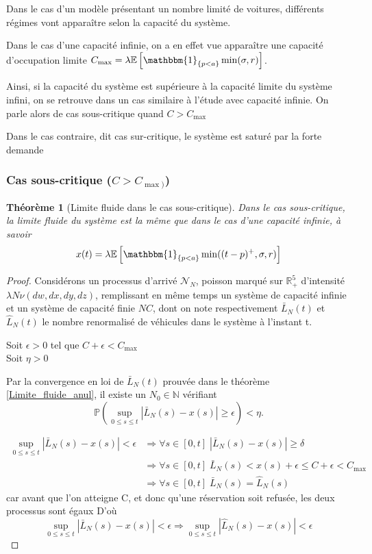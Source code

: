 \documentclass[12pt,a4paper]{article}
\newcommand{\E}[1]{\mathbb{E}\left[ #1 \right]}
\newcommand{\R}{\mathbb{R}}
\newcommand{\1}[1]{\mathbbm{1}_{\{#1\}} }
\newtheorem{theorem}{Théorème}
\theoremstyle{definition}
\begin{document}
{Dans le cas d'un modèle présentant un nombre limité de voitures, différents régimes vont apparaître selon la capacité du système.

Dans le cas d'une capacité infinie, on a en effet vue apparaître une capacité d'occupation limite $C_{\max} = \lambda \E{\1{p<a}\min(\sigma,r)}$.

Ainsi, si la capacité du système est supérieure à la capacité limite du système infini, on se retrouve dans un cas similaire à l'étude avec capacité infinie. On parle alors de cas sous-critique quand $C > C_{\max}$

Dans le cas contraire, dit cas sur-critique, le système est saturé par la forte demande



\subsubsection{Cas sous-critique ($C>C_{\max)}$)}

\begin{theorem}[Limite fluide dans le cas sous-critique]
Dans le cas sous-critique, la limite fluide du système est la même que dans le cas d'une capacité infinie, à savoir $$x(t) = \lambda\E{\1{p<a}\min((t-p)^+,\sigma,r)}$$ 

\end{theorem}
\begin{proof}
Considérons un processus d'arrivé $\mathcal{N}_N$, poisson marqué sur $\R_+^5$ d'intensité $\lambda N \nu(dw,dx,dy,dz)$, remplissant en même temps un système de capacité infinie et un système de capacité finie $NC$, dont on note respectivement $\bar{L}_N(t)$ et $\hat{L}_N(t)$ le nombre renormalisé de véhicules dans le système à l'instant t.

Soit $\epsilon>0$ tel que $C+\epsilon<C_{\max}$\\
Soit $\eta >0$

Par la convergence en loi de $\bar{L}_N(t)$ prouvée dans le théorème  \ref{Limite_fluide_anul}, il existe un $N_0\in \mathbb{N}$ vérifiant
$$\mathbb{P}\left(\underset{0\leq s \leq t}{\sup} |\bar{L}_N(s) - x(s)| \geq \epsilon \right) < \eta.$$

\begin{align}
\underset{0\leq s \leq t}{\sup} |\bar{L}_N(s) - x(s)| < \epsilon & \Rightarrow \forall s \in [0,t]\; |\bar{L}_N(s) - x(s)| \geq \delta\\
& \Rightarrow \forall s \in [0,t] \;\bar{L}_N(s) < x(s) + \epsilon \leq C + \epsilon <C_{\max}\\
& \Rightarrow \forall s \in [0,t]\;\bar{L}_N(s) = \hat{L}_N(s)
\end{align}
car avant que l'on atteigne C, et donc qu'une réservation soit refusée, les deux processus sont égaux
D'où $$\underset{0\leq s \leq t}{\sup} |\bar{L}_N(s) - x(s)| < \epsilon  \Rightarrow \underset{0\leq s \leq t}{\sup} |\hat{L}_N(s) - x(s)| < \epsilon $$



\end{proof}}
\end{document}
